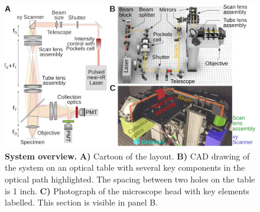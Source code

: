 \documentclass[10pt,letterpaper]{article}
\begin{document}
\begin{figure}[!t]
    \includegraphics[width=\textwidth]{fig1.jpg}
    \caption{{\bf System overview.} \textbf{A)} Cartoon of the layout. \textbf{B)}
    CAD drawing of the system on an optical table with several key components in the optical path highlighted. The spacing between two holes on the table is 1 inch. \textbf{C)} Photograph of the microscope head with key elements labelled. This section is visible in panel B.}
    \label{fig1}
\end{figure}
\end{document}
